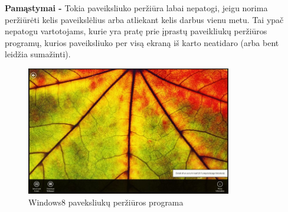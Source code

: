 ﻿\documentclass[a4paper, 12pt]{article}
\begin{document}
		\textbf{Pamąstymai -}
		Tokia paveiksliuko peržiūra labai nepatogi, jeigu norima peržiūrėti kelis paveikslėlius arba atliekant kelis darbus vienu metu.
		Tai ypač nepatogu vartotojams, kurie yra pratę prie įprastų paveikliukų peržiūros programų, kurios paveiksliuko per visą ekraną iš karto neatidaro (arba bent leidžia sumažinti).

		\begin{figure}[h]
		\centering
		\includegraphics[width=0.8\textwidth]{images/win8.jpg}
		\caption{Windows8 paveksliukų peržiūros programa}
		\label{win8}
		\end{figure}
\end{document}
